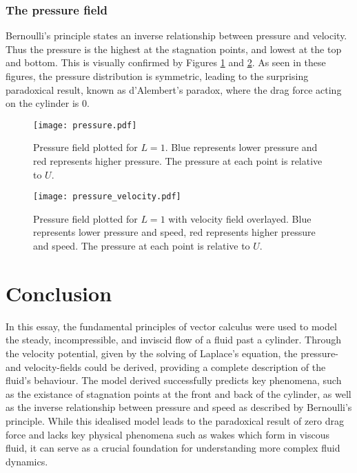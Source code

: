 \subsubsection{The pressure field}
Bernoulli's principle states an inverse relationship between pressure and velocity. Thus the pressure is the highest at the stagnation points,
and lowest at the top and bottom. This is visually confirmed by Figures \ref{figure:pressure:1} and \ref{figure:pressure:2}. As seen in these figures,
the pressure distribution is symmetric, leading to the surprising paradoxical result, known as d'Alembert's paradox, where the drag force acting on the cylinder is $0$.
\begin{figure}
	\centering
	\texttt{[image: pressure.pdf]}
	\caption{Pressure field plotted for $L=1$. Blue represents lower pressure and red represents higher pressure. The pressure at each point is relative to $U$.}
	\label{figure:pressure:1}
\end{figure}
\begin{figure}
	\centering
	\texttt{[image: pressure\_velocity.pdf]}
	\caption{Pressure field plotted for $L=1$ with velocity field overlayed. Blue represents lower pressure and speed, red represents higher pressure and speed. The pressure at each point is relative to $U$.}
	\label{figure:pressure:2}
\end{figure}

\section{Conclusion}
In this essay, the fundamental principles of vector calculus were used to model the steady, incompressible, and inviscid flow of a fluid past a cylinder.
Through the velocity potential, given by the solving of Laplace's equation, the pressure- and velocity-fields could be derived, providing a complete 
description of the fluid's behaviour. The model derived successfully predicts key phenomena, such as the existance of stagnation points at the front and
back of the cylinder, as well as the inverse relationship between pressure and speed as described by Bernoulli's principle. While this idealised model
leads to the paradoxical result of zero drag force and lacks key physical phenomena such as wakes which form in viscous fluid, it can serve as a crucial
foundation for understanding more complex fluid dynamics.